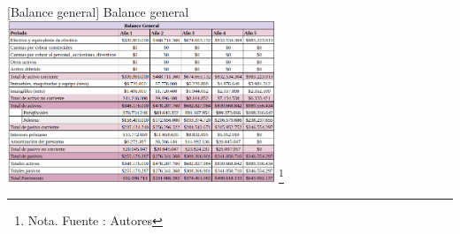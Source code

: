\vspace{2mm}
\begin{minipage}{0.8\textwidth}
\centering
{}[{Balance general}]{ Balance general }
\label{balanceGeneral}
\includegraphics[width=0.6\textwidth]{Content/Images/AF/Balance_General.png}
\footnote{Nota. \textup{Fuente : Autores}}
\end{minipage}
\newpage